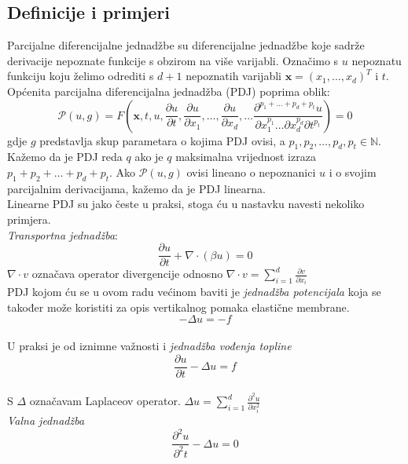 \documentclass[zavrsnirad]{../fer}
\begin{document}
\subsection{Definicije i primjeri}

Parcijalne diferencijalne jednadžbe su diferencijalne 
jednadžbe koje sadrže derivacije nepoznate funkcije s
obzirom na više varijabli. Označimo s $u$ nepoznatu funkciju
koju želimo odrediti s $d + 1$ nepoznatih varijabli 
$\textbf{x} = (x_1, \dots, x_d)^T$ i $t$. Općenita parcijalna diferencijalna 
jednadžba (PDJ) poprima oblik:
$$\mathcal{P}(u, g) = F(\textbf{x}, t, u,
\frac{\partial u}{\partial t},
\frac{\partial u}{\partial x_1},
\dots,
\frac{\partial u}{\partial x_d},
\dots
\frac{\partial^{p_1 + \dots + p_d + p_t} u} 
{\partial x_1^{p_1}\dots\partial x_d^{p_d} \partial t^{p_t}}
) = 0$$
gdje $g$ predstavlja skup parametara o kojima PDJ ovisi, a 
$p_1, p_2, \dots, p_d, p_t \in \mathbb{N}$. Kažemo da 
je PDJ reda $q$ ako je $q$ maksimalna vrijednost izraza 
$p_1 + p_2 + \dots + p_d + p_t$. 
Ako $\mathcal{P}(u,g)$ ovisi lineano o nepoznanici $u$ 
i o svojim parcijalnim derivacijama, kažemo da je 
PDJ  linearna.
\bigskip
\\ 
Linearne PDJ su jako česte u praksi, stoga ću u nastavku 
navesti nekoliko primjera.\\
\textit{Transportna jednadžba}:
$$\frac{\partial u}{\partial t} + \nabla \cdot (\beta u) = 0$$
$\nabla \cdot v$ označava operator divergencije odnosno 
$\nabla \cdot v = \sum_{i=1}^d \frac{\partial v}{\partial x_i}$
\bigskip 
\\
PDJ kojom ću se u ovom radu većinom
baviti je \textit{jednadžba potencijala} koja
se također može koristiti za opis vertikalnog
pomaka elastične membrane. 
\begin{equation}
  \label{potencijalPDJ}
- \Delta u = - f 
\end{equation}
\\ 
U praksi je od iznimne važnosti i \textit{jednadžba vođenja topline}
\begin{equation}
  \frac{\partial u}{\partial t} - \Delta u = f
\end{equation}
\bigskip 
\\ 
S $\Delta$ označavam Laplaceov operator.
$\Delta u = \sum_{i = 1}^d \frac{\partial^2 u}{\partial x_i ^2}$ 
\bigskip 
\\
\textit{Valna jednadžba}
\begin{equation}
  \frac{\partial ^2 u}{\partial^2 t} - \Delta u = 0
\end{equation}
\end{document}
